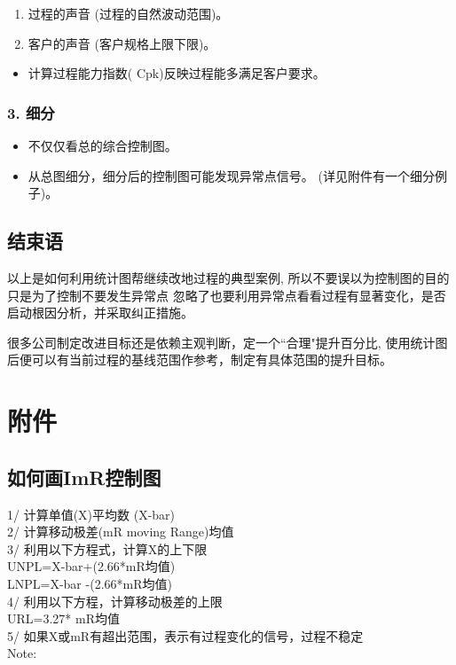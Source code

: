 \begin{enumerate}
\tightlist
\item
  过程的声音 (过程的自然波动范围)。
\item
  客户的声音 (客户规格上限下限)。
\end{enumerate}

\begin{itemize}
\tightlist
\item
  计算过程能力指数( Cpk)反映过程能多满足客户要求。
\end{itemize}

\hypertarget{ux7ec6ux5206}{%
\subsubsection{3. 细分}\label{ux7ec6ux5206}}

\begin{itemize}
\tightlist
\item
  不仅仅看总的综合控制图。
\item
  从总图细分，细分后的控制图可能发现异常点信号。
  (详见附件有一个细分例子)。
\end{itemize}

\hypertarget{ux603bux7ed3}{%
\subsection{结束语}\label{ux603bux7ed3}}

以上是如何利用统计图帮继续改地过程的典型案例,
所以不要误以为控制图的目的只是为了控制不要发生异常点
忽略了也要利用异常点看看过程有显著变化，是否启动根因分析，并采取纠正措施。

很多公司制定改进目标还是依赖主观判断，定一个``合理"提升百分比,
使用统计图后便可以有当前过程的基线范围作参考，制定有具体范围的提升目标。

\hypertarget{ux9644ux4ef6}{%
\section{附件}\label{ux9644ux4ef6}}

\hypertarget{ux5982ux4f55ux753bimrux63a7ux5236ux56fe}{%
\subsection{如何画ImR控制图}\label{ux5982ux4f55ux753bimrux63a7ux5236ux56fe}}

1/ 计算单值(X)平均数 (X-bar)\\
2/ 计算移动极差(mR moving Range)均值\\
3/ 利用以下方程式，计算X的上下限\\
UNPL=X-bar+(2.66*mR均值)\\
LNPL=X-bar -(2.66*mR均值)\\
4/ 利用以下方程，计算移动极差的上限\\
URL=3.27* mR均值\\
5/ 如果X或mR有超出范围，表示有过程变化的信号，过程不稳定\\
Note:

